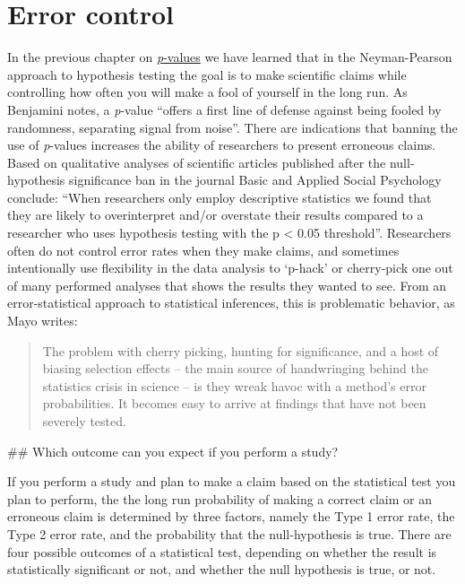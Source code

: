 \documentclass[
]{krantz}
\begin{document}
\hypertarget{errorcontrol}{%
\chapter{Error control}\label{errorcontrol}}

In the previous chapter on \protect\hyperlink{pvalue}{\emph{p}-values} we have learned that in the Neyman-Pearson approach to hypothesis testing the goal is to make scientific claims while controlling how often you will make a fool of yourself in the long run. As Benjamini \citeyearpar{benjamini_its_2016} notes, a \emph{p}-value ``offers a first line of defense against being fooled by randomness, separating signal from noise''. There are indications that banning the use of \emph{p}-values increases the ability of researchers to present erroneous claims. Based on qualitative analyses of scientific articles published after the null-hypothesis significance ban in the journal Basic and Applied Social Psychology \citet{fricker_assessing_2019} conclude: ``When researchers only employ descriptive statistics we found that they are likely to overinterpret and/or overstate their results compared to a researcher who uses hypothesis testing with the p \textless{} 0.05 threshold''. Researchers often do not control error rates when they make claims, and sometimes intentionally use flexibility in the data analysis to `p-hack' or cherry-pick one out of many performed analyses that shows the results they wanted to see. From an error-statistical approach to statistical inferences, this is problematic behavior, as Mayo \citeyearpar{mayo_statistical_2018} writes:

\begin{quote}
The problem with cherry picking, hunting for significance, and a host of biasing selection effects -- the main source of handwringing behind the statistics crisis in science -- is they wreak havoc with a method's error probabilities. It becomes easy to arrive at findings that have not been severely tested.
\end{quote}

\#\# Which outcome can you expect if you perform a study?

If you perform a study and plan to make a claim based on the statistical test you plan to perform, the the long run probability of making a correct claim or an erroneous claim is determined by three factors, namely the Type 1 error rate, the Type 2 error rate, and the probability that the null-hypothesis is true. There are four possible outcomes of a statistical test, depending on whether the result is statistically significant or not, and whether the null hypothesis is true, or not.
\end{document}
